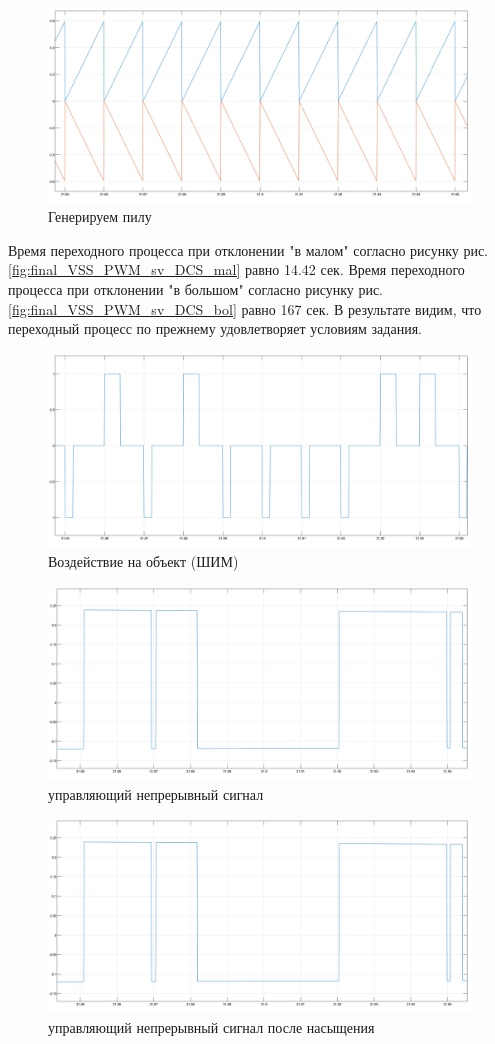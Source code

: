 \begin{figure}[!h]\centering
	\includegraphics[width=0.6\linewidth]{images/final_VSS_PWM_DCS_SAW}
	\caption{ Генерируем пилу}\label{fig:final_VSS_PWM_DCS_SAW}
\end{figure}
Время переходного процесса при отклонении "в малом" согласно рисунку рис.\ref{fig:final_VSS_PWM_sv_DCS_mal} равно 14.42 сек.
Время переходного процесса при отклонении "в большом" согласно рисунку рис.\ref{fig:final_VSS_PWM_sv_DCS_bol} равно 167 сек.
В результате видим, что переходный процесс по прежнему удовлетворяет условиям задания.
\begin{figure}[!h]\centering
	\includegraphics[width=0.6\linewidth]{images/final_VSS_PWM_DCS_PWM}
	\caption{ Воздействие на объект (ШИМ)}\label{fig:final_VSS_PWM_DCS_PWM}
\end{figure}
\begin{figure}[!h]\centering
	\includegraphics[width=0.6\linewidth]{images/final_VSS_PWM_DCS_upr}
	\caption{ управляющий непрерывный сигнал }\label{fig:final_VSS_PWM_DCS_upr}
\end{figure}
\begin{figure}[!h]\centering
	\includegraphics[width=0.6\linewidth]{images/final_VSS_PWM_DCS_upr_ogr}
	\caption{ управляющий непрерывный сигнал после насыщения}\label{fig:final_VSS_PWM_DCS_upr_ogr}
\end{figure}
